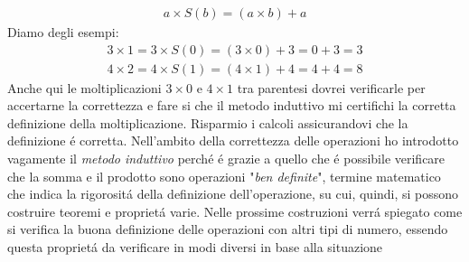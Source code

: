 \documentclass[twoside]{article} %
\begin{document}
	\begin{gather*}
		a\times S(b)=(a\times b)+a
	\end{gather*}
	Diamo degli esempi:
	\begin{gather*}
		3\times 1=3\times S(0)=(3\times 0)+3=0+3=3\\
		4\times 2=4\times S(1)=(4\times 1)+4=4+4=8
	\end{gather*}
	Anche qui le moltiplicazioni $3\times 0$ e $4\times 1$ tra parentesi dovrei verificarle per accertarne la correttezza e fare si che il metodo induttivo mi certifichi la corretta definizione della moltiplicazione. Risparmio i calcoli assicurandovi che la definizione \'e corretta.
	\newpage
	\noindent Nell'ambito della correttezza delle operazioni ho introdotto vagamente il \textit{metodo induttivo} perch\'e \'e grazie a quello che \'e possibile verificare che la somma e il prodotto sono operazioni "\textit{ben definite}", termine matematico che indica la rigorosit\'a della definizione dell'operazione, su cui, quindi, si possono costruire teoremi e propriet\'a varie. Nelle prossime costruzioni verr\'a spiegato come si verifica la buona definizione delle operazioni con altri tipi di numero, essendo questa propriet\'a da verificare in modi diversi in base alla situazione
	\newpage
\end{document}
